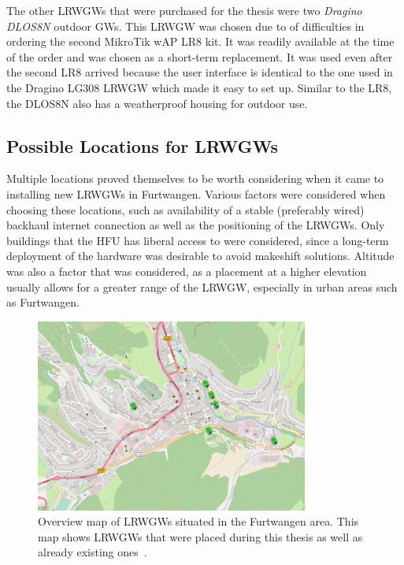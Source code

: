 The other \aclp{LRWGW} that were purchased for the thesis were two \emph{Dragino DLOS8N} outdoor \aclp{GW}.
This \acl{LRWGW} was chosen due to of difficulties in ordering the second MikroTik wAP LR8 kit.
It was readily available at the time of the order and was chosen as a short-term replacement.
It was used even after the second LR8 arrived because the user interface is identical to the one used in the Dragino LG308 \acl{LRWGW} which made it easy to set up.
Similar to the LR8, the DLOS8N also has a weatherproof housing for outdoor use.

\subsection{Possible Locations for \aclp{LRWGW}}\label{sec:gateway-locations}

Multiple locations proved themselves to be worth considering when it came to installing new \aclp{LRWGW} in Furtwangen.
Various factors were considered when choosing these locations, such as availability of a stable (preferably wired) backhaul internet connection as well as the positioning of the \aclp{LRWGW}.
Only buildings that the \ac{HFU} has liberal access to were considered, since a long-term deployment of the hardware was desirable to avoid makeshift solutions.
Altitude was also a factor that was considered, as a placement at a higher elevation usually allows for a greater range of the \acl{LRWGW}, especially in urban areas such as Furtwangen.

\begin{figure}[htbp]
    \centering
    \includegraphics[width=0.8\textwidth]{pictures/hardware/gateway-deployment/gateway_deployment_map.png}
    \caption{
        Overview map of \aclp{LRWGW} situated in the Furtwangen area.
        This map shows \aclp{LRWGW} that were placed during this thesis as well as already existing ones~\cite{ttn_mapper_ttn_2023}.
    }\label{pic:gateways-placement-map}
\end{figure}

